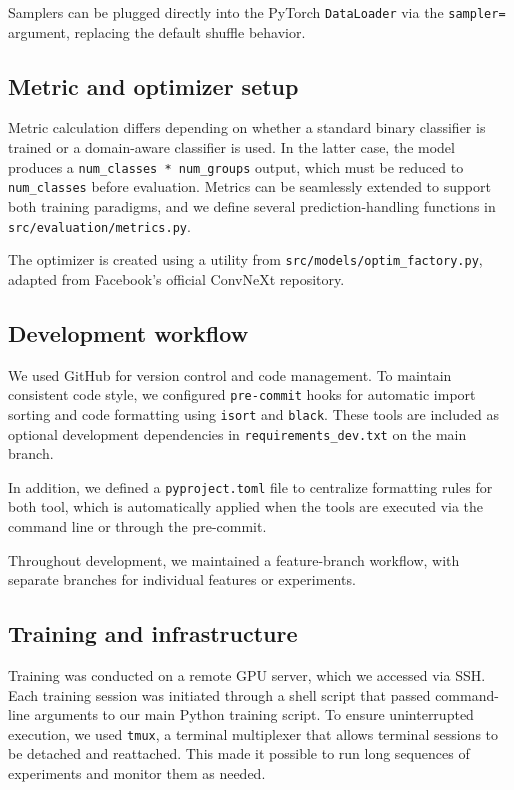 Samplers can be plugged directly into the PyTorch \texttt{DataLoader} via the \texttt{sampler=} argument, replacing the default shuffle behavior.

\subsection{Metric and optimizer setup}

Metric calculation differs depending on whether a standard binary classifier is trained or a domain-aware classifier is used. In the latter case, the model produces a \texttt{num\_classes~*~num\_groups} output, which must be reduced to \texttt{num\_classes} before evaluation. Metrics can be seamlessly extended to support both training paradigms, and we define several prediction-handling functions in \texttt{src/evaluation/metrics.py}.

The optimizer is created using a utility from \texttt{src/models/optim\_factory.py}, adapted from Facebook’s official ConvNeXt repository.


\subsection{Development workflow}

We used GitHub for version control and code management. To maintain consistent code style, we configured \texttt{pre-commit} hooks for automatic import sorting and code formatting using \texttt{isort} and \texttt{black}. These tools are included as optional development dependencies in \texttt{requirements\_dev.txt} on the main branch.

In addition, we defined a \texttt{pyproject.toml} file to centralize formatting rules for both tool, which is automatically applied when the tools are executed via the command line or through the pre-commit.

Throughout development, we maintained a feature-branch workflow, with separate branches for individual features or experiments.

\subsection{Training and infrastructure}
Training was conducted on a remote GPU server, which we accessed via SSH. Each training session was initiated through a shell script that passed command-line arguments to our main Python training script. To ensure uninterrupted execution, we used \texttt{tmux}, a terminal multiplexer that allows terminal sessions to be detached and reattached. This made it possible to run long sequences of experiments and monitor them as needed.

